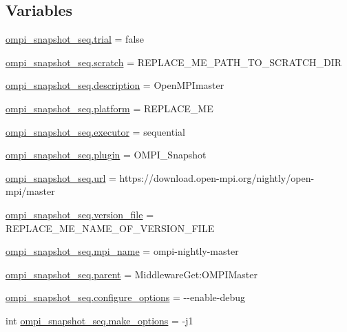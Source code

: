 \subsection*{Variables}
\begin{DoxyCompactItemize}
\item 
\hyperlink{namespaceompi__snapshot__seq_a10070286ec527c9dfed8c210ca3917d7}{ompi\-\_\-snapshot\-\_\-seq.\-trial} = false
\item 
\hyperlink{namespaceompi__snapshot__seq_a8855b0a58b147479b623ede37dab8378}{ompi\-\_\-snapshot\-\_\-seq.\-scratch} = R\-E\-P\-L\-A\-C\-E\-\_\-\-M\-E\-\_\-\-P\-A\-T\-H\-\_\-\-T\-O\-\_\-\-S\-C\-R\-A\-T\-C\-H\-\_\-\-D\-I\-R
\item 
\hyperlink{namespaceompi__snapshot__seq_a918891e52aa1a572f039326981585a7a}{ompi\-\_\-snapshot\-\_\-seq.\-description} = Open\-M\-P\-Imaster
\item 
\hyperlink{namespaceompi__snapshot__seq_a300d0cc664225df572aad2518569d7bf}{ompi\-\_\-snapshot\-\_\-seq.\-platform} = R\-E\-P\-L\-A\-C\-E\-\_\-\-M\-E
\item 
\hyperlink{namespaceompi__snapshot__seq_a6293c71d0991763a4bad8b010e0e6ce2}{ompi\-\_\-snapshot\-\_\-seq.\-executor} = sequential
\item 
\hyperlink{namespaceompi__snapshot__seq_a4964274b9eb87e06a95ee1bef66604ef}{ompi\-\_\-snapshot\-\_\-seq.\-plugin} = O\-M\-P\-I\-\_\-\-Snapshot
\item 
\hyperlink{namespaceompi__snapshot__seq_a0af6b7793981b72fee25ffd1d077fd86}{ompi\-\_\-snapshot\-\_\-seq.\-url} = https\-://download.\-open-\/mpi.\-org/nightly/open-\/mpi/master
\item 
\hyperlink{namespaceompi__snapshot__seq_ab1bd70042bbcbfc640abba12010ed2b5}{ompi\-\_\-snapshot\-\_\-seq.\-version\-\_\-file} = R\-E\-P\-L\-A\-C\-E\-\_\-\-M\-E\-\_\-\-N\-A\-M\-E\-\_\-\-O\-F\-\_\-\-V\-E\-R\-S\-I\-O\-N\-\_\-\-F\-I\-L\-E
\item 
\hyperlink{namespaceompi__snapshot__seq_a464fbb2313394347fa064032378c5674}{ompi\-\_\-snapshot\-\_\-seq.\-mpi\-\_\-name} = ompi-\/nightly-\/master
\item 
\hyperlink{namespaceompi__snapshot__seq_a08a86b12770df9f65150ce521c8820b6}{ompi\-\_\-snapshot\-\_\-seq.\-parent} = Middleware\-Get\-:\-O\-M\-P\-I\-Master
\item 
\hyperlink{namespaceompi__snapshot__seq_affb396ef384900a98c5a943dd8817711}{ompi\-\_\-snapshot\-\_\-seq.\-configure\-\_\-options} = -\/-\/enable-\/debug
\item 
int \hyperlink{namespaceompi__snapshot__seq_a42ad6d7d01611e1404c4747596bad26f}{ompi\-\_\-snapshot\-\_\-seq.\-make\-\_\-options} = -\/j1

\end{DoxyCompactItemize}
